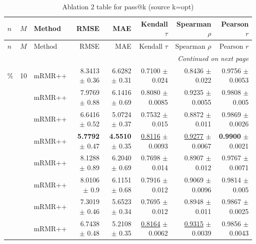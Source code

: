 \footnotesize
\setlength{\tabcolsep}{2pt}
\renewcommand{\arraystretch}{1.05}
\setlength{\LTpre}{0pt}
\setlength{\LTpost}{0pt}
\setlength{\LTleft}{\fill}
\setlength{\LTright}{\fill}
\begin{longtable}{llp{}rrrrr}
\caption{Ablation 2 table for pass@k (source k=opt)}\label{tab:ablation\_2\_passk\_kopt}\\
\toprule
$n$ & $M$ & Method & RMSE & MAE & Kendall $\tau$ & Spearman $\rho$ & Pearson $r$ \\
\midrule
\endfirsthead
\toprule
$n$ & $M$ & Method & RMSE & MAE & Kendall $\tau$ & Spearman $\rho$ & Pearson $r$ \\
\midrule
\endhead
\midrule
\multicolumn{8}{r}{\emph{Continued on next page}} \\
\midrule
\endfoot
\bottomrule
\endlastfoot
5\% & 10 & mRMR++ & 8.3413 {\scriptsize $\pm$ 0.36} & 6.6282 {\scriptsize $\pm$ 0.31} & 0.7100 {\scriptsize $\pm$ 0.024} & 0.8436 {\scriptsize $\pm$ 0.022} & 0.9756 {\scriptsize $\pm$ 0.0053} \\
 &  & mRMR++ & 7.9769 {\scriptsize $\pm$ 0.88} & 6.1416 {\scriptsize $\pm$ 0.69} & 0.8080 {\scriptsize $\pm$ 0.0085} & 0.9235 {\scriptsize $\pm$ 0.0055} & 0.9808 {\scriptsize $\pm$ 0.005} \\
 &  & mRMR++ & 6.6416 {\scriptsize $\pm$ 0.52} & 5.0724 {\scriptsize $\pm$ 0.37} & 0.7532 {\scriptsize $\pm$ 0.015} & 0.8872 {\scriptsize $\pm$ 0.011} & 0.9869 {\scriptsize $\pm$ 0.0026} \\
 &  & mRMR++ & \textbf{5.7792} {\scriptsize $\pm$ 0.47} & \textbf{4.5510} {\scriptsize $\pm$ 0.35} & \underline{0.8116} {\scriptsize $\pm$ 0.0093} & \underline{0.9277} {\scriptsize $\pm$ 0.0067} & \textbf{0.9900} {\scriptsize $\pm$ 0.0021} \\
 &  & mRMR++ & 8.1288 {\scriptsize $\pm$ 0.89} & 6.2040 {\scriptsize $\pm$ 0.69} & 0.7698 {\scriptsize $\pm$ 0.014} & 0.8907 {\scriptsize $\pm$ 0.012} & 0.9767 {\scriptsize $\pm$ 0.0071} \\
 &  & mRMR++ & 8.0106 {\scriptsize $\pm$ 0.9} & 6.1151 {\scriptsize $\pm$ 0.68} & 0.7916 {\scriptsize $\pm$ 0.012} & 0.9069 {\scriptsize $\pm$ 0.0096} & 0.9814 {\scriptsize $\pm$ 0.005} \\
 &  & mRMR++ & 7.3019 {\scriptsize $\pm$ 0.46} & 5.6523 {\scriptsize $\pm$ 0.34} & 0.7695 {\scriptsize $\pm$ 0.012} & 0.8948 {\scriptsize $\pm$ 0.011} & 0.9867 {\scriptsize $\pm$ 0.0025} \\
 &  & mRMR++ & 6.7438 {\scriptsize $\pm$ 0.48} & 5.2108 {\scriptsize $\pm$ 0.35} & \underline{0.8164} {\scriptsize $\pm$ 0.0062} & \underline{0.9315} {\scriptsize $\pm$ 0.0039} & 0.9856 {\scriptsize $\pm$ 0.0043} \\

\end{longtable}

